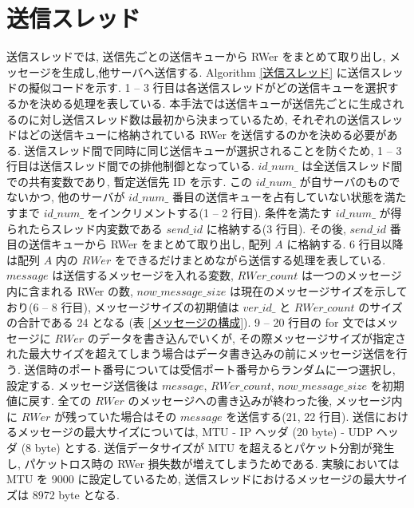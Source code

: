 \section{送信スレッド}\label{sub:送信スレッド}

送信スレッドでは, 送信先ごとの送信キューから RWer をまとめて取り出し, メッセージを生成し,他サーバへ送信する. Algorithm \ref{送信スレッド} に送信スレッドの擬似コードを示す. 1 -- 3 行目は各送信スレッドがどの送信キューを選択するかを決める処理を表している. 本手法では送信キューが送信先ごとに生成されるのに対し送信スレッド数は最初から決まっているため, それぞれの送信スレッドはどの送信キューに格納されている RWer を送信するのかを決める必要がある. 送信スレッド間で同時に同じ送信キューが選択されることを防ぐため, 1 -- 3 行目は送信スレッド間での排他制御となっている. $id\_num\_$ は全送信スレッド間での共有変数であり, 暫定送信先 ID を示す. この $id\_num\_$ が自サーバのものでないかつ, 他のサーバが $id\_num\_$ 番目の送信キューを占有していない状態を満たすまで $id\_num\_$ をインクリメントする(1 -- 2 行目). 条件を満たす $id\_num\_$ が得られたらスレッド内変数である $send\_id$ に格納する(3 行目). その後, $send\_id$ 番目の送信キューから RWer をまとめて取り出し, 配列 $A$ に格納する. 6 行目以降は配列 $A$ 内の $RWer$ をできるだけまとめながら送信する処理を表している. $message$ は送信するメッセージを入れる変数, $RWer\_count$ は一つのメッセージ内に含まれる RWer の数, $now\_message\_size$ は現在のメッセージサイズを示しており(6 -- 8 行目), メッセージサイズの初期値は $ver\_id\_$ と $RWer\_count$ のサイズの合計である 24 となる (表 \ref{メッセージの構成}). 9 -- 20 行目の for 文ではメッセージに $RWer$ のデータを書き込んでいくが, その際メッセージサイズが指定された最大サイズを超えてしまう場合はデータ書き込みの前にメッセージ送信を行う. 送信時のポート番号については受信ポート番号からランダムに一つ選択し, 設定する. メッセージ送信後は $message$, $RWer\_count$, $now\_message\_size$ を初期値に戻す. 全ての $RWer$ のメッセージへの書き込みが終わった後, メッセージ内に $RWer$ が残っていた場合はその $message$ を送信する(21, 22 行目). 送信におけるメッセージの最大サイズについては, MTU - IP ヘッダ (20 byte) - UDP ヘッダ (8 byte) とする. 送信データサイズが MTU を超えるとパケット分割が発生し, パケットロス時の RWer 損失数が増えてしまうためである. 実験においては MTU を 9000 に設定しているため, 送信スレッドにおけるメッセージの最大サイズは 8972 byte となる. 

